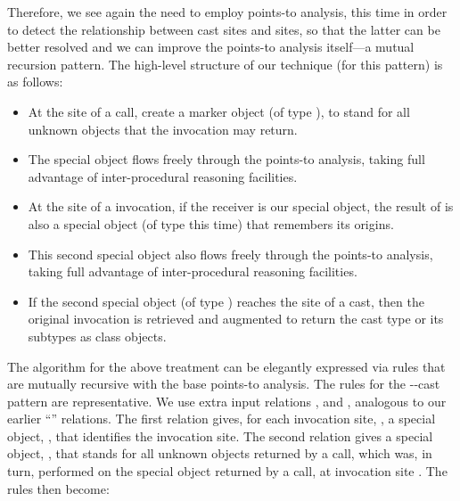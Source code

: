 Therefore, we see again the need to employ points-to analysis, this
time in order to detect the relationship between cast sites and
 sites, so that the latter can be better resolved and we
can improve the points-to analysis itself---a mutual recursion
pattern. The high-level structure of our technique (for this pattern)
is as follows:

\begin{itemize}
\item At the site of a  call, create a marker object (of
  type ), to stand for all unknown
  objects that the invocation may return.
\item The special object flows freely through the points-to analysis,
  taking full advantage of inter-procedural reasoning facilities.
\item At the site of a  invocation, if the receiver
  is our special object, the result of  is also a
  special object (of type  this time)
  that remembers its  origins.
\item This second special object also flows freely through the
  points-to analysis, taking full advantage of inter-procedural
  reasoning facilities.
\item If the second special object (of type
  ) reaches the site of a cast, then
  the original  invocation is retrieved and augmented to
  return the cast type or its subtypes as class objects.
\end{itemize}



The algorithm for the above treatment can be elegantly expressed via
rules that are mutually recursive with the base points-to analysis.
The rules for the --cast pattern
are representative. We use extra input relations
, and
, analogous to our earlier
``'' relations. The first relation gives, for
each  invocation site, , a special object,
, that identifies the invocation site. The second relation
gives a special object, , that stands for all unknown objects
returned by a  call, which was, in turn, performed on
the special object returned by a  call, at invocation site
. The rules then become:

